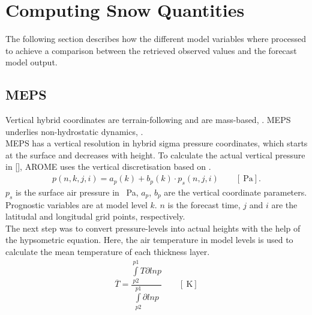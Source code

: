 \section{Computing Snow Quantities} \label{sec:data_proc}
The following section describes how the different model variables where processed to achieve a comparison between the retrieved observed values and the forecast model output. 

\subsection{MEPS}\label{sec:layer_thickness}
Vertical hybrid coordinates are terrain-following and are mass-based, \citep{muller_arome-metcoop:_2017}. %
MEPS underlies non-hydrostatic dynamics, \cite{metcoop_wiki_description_2017}.
\\
MEPS has a vertical resolution in hybrid sigma pressure coordinates, which starts at the surface and decreases with height. To calculate the actual vertical pressure in [\SI{}{\hPa}], AROME uses the vertical discretisation based on \citet{simmons_energy_1981}. %
\begin{align}
p(n,k,j,i) = a_p(k) + b_p(k) \cdot p_s(n,j,i) \qquad [\SI{}{\Pa}].
\label{eq:hybrid_sigma_pressure}
\end{align}
$p_s$ is the surface air pressure in \SI{}{\Pa}, $a_p$, $b_p$ are the vertical coordinate parameters. Prognostic variables are at model level $k$. $n$ is the forecast time, $j$ and $i$ are the latitudal and longitudal grid points, respectively.
\\
The next step was to convert pressure-levels into actual heights with the help of the hypsometric equation. Here, the air temperature in model levels is used to calculate the mean temperature of each thickness layer. 
\begin{align}
\overline{T} = \dfrac{\int\limits_{p2}^{p1} T \partial ln p}{\int\limits_{p2}^{p1}\partial ln p} \qquad [\SI{}{\kelvin}]
\label{eq:T_avg}
\end{align}

